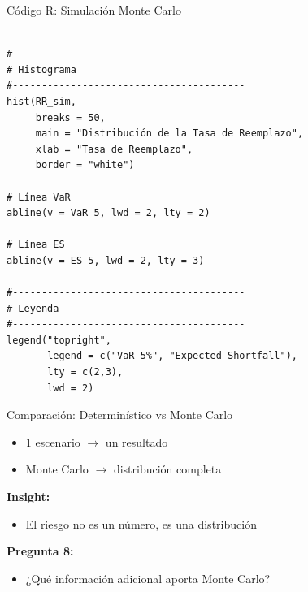 \documentclass{beamer}
\begin{document}
\begin{frame}[fragile]{Código R: Simulación Monte Carlo}
\tiny
\begin{verbatim}
    
#----------------------------------------
# Histograma
#----------------------------------------
hist(RR_sim,
     breaks = 50,
     main = "Distribución de la Tasa de Reemplazo",
     xlab = "Tasa de Reemplazo",
     border = "white")

# Línea VaR
abline(v = VaR_5, lwd = 2, lty = 2)

# Línea ES
abline(v = ES_5, lwd = 2, lty = 3)

#----------------------------------------
# Leyenda
#----------------------------------------
legend("topright",
       legend = c("VaR 5%", "Expected Shortfall"),
       lty = c(2,3),
       lwd = 2)

\end{verbatim}
    
\end{frame}

\begin{frame}{Comparación: Determinístico vs Monte Carlo}

\begin{itemize}
\item 1 escenario $\rightarrow$ un resultado
\item Monte Carlo $\rightarrow$ distribución completa
\end{itemize}

\vspace{0.4cm}

\textbf{Insight:}
\begin{itemize}
\item El riesgo no es un número, es una distribución
\end{itemize}

\vspace{0.4cm}

\textbf{Pregunta 8:}
\begin{itemize}
\item ¿Qué información adicional aporta Monte Carlo?
\end{itemize}

\end{frame}
\end{document}
